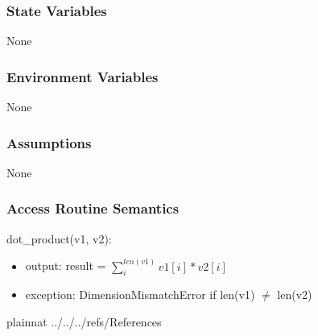 \documentclass[12pt, titlepage]{article}
\begin{document}
\subsubsection{State Variables}
None

\subsubsection{Environment Variables}

None

\subsubsection{Assumptions}

None

\subsubsection{Access Routine Semantics}

\noindent dot\_product(v1, v2):
\begin{itemize}
\item output: result = $\sum_i^{len(v1)} v1[i] * v2[i]$
\item exception: DimensionMismatchError if len(v1) $\neq$ len(v2)
\end{itemize}




\newpage

 {plainnat}
 {../../../refs/References}

\newpage

\newpage{}
\end{document}
